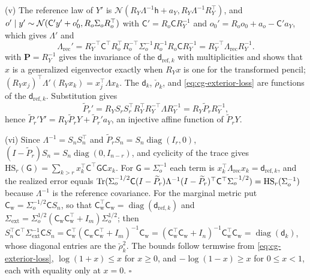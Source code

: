 (v) The reference law of \(Y'\) is
\(\mathcal N(R_Y\Lambda^{-1}\mathsf h+a_Y,R_Y\Lambda^{-1}R_Y^\top)\), and
\(o'\mid y'\sim\mathcal N(\mathsf C'y'+o_0',R_o\Sigma_oR_o^\top)\) with
\(\mathsf C'=R_o\mathsf CR_Y^{-1}\) and \(o_0'=R_oo_0+a_o-\mathsf C'a_Y\), which gives
\(\Lambda'\) and
\begin{equation*}
\Lambda_{\mathrm{rec}}'=R_Y^{-\top}\mathsf C^\top R_o^\top R_o^{-\top}\Sigma_o^{-1}R_o^{-1}R_o\mathsf CR_Y^{-1}=R_Y^{-\top}\Lambda_{\mathrm{rec}}R_Y^{-1}.
\end{equation*}
 with \(\mathbf P=R_Y^{-1}\) gives the invariance of
the \(\mathsf d_{\mathrm{ref},k}\) with multiplicities and shows that \(x\) is a
generalized eigenvector exactly when \(R_Yx\) is one for the transformed pencil;
\((R_Yx_j)^\top\Lambda'(R_Yx_k)=x_j^\top\Lambda x_k\). The \(\mathsf d_k\),
\(\check\rho_k\), and \eqref{eq:cg-exterior-loss} are functions of the
\(\mathsf d_{\mathrm{ref},k}\). Substitution gives
\begin{equation*}
\widetilde P_r'=R_YS_rS_r^\top R_Y^\top R_Y^{-\top}\Lambda R_Y^{-1}=R_Y\widetilde P_rR_Y^{-1},
\end{equation*}
hence \(\widetilde P_r'Y'=R_Y\widetilde P_rY+\widetilde P_r'a_Y\), an injective affine
function of \(\widetilde P_rY\).

(vi) Since \(\Lambda^{-1}=S_nS_n^\top\) and \(\widetilde P_rS_n=S_n\operatorname{diag}(I_r,0)\),
\((I-\widetilde P_r)S_n=S_n\operatorname{diag}(0,I_{n-r})\), and cyclicity of the trace
gives \(\mathrm{HS}_r(\mathsf G)=\sum_{k>r}x_k^\top\mathsf C^\top\mathsf G\mathsf Cx_k\).
For \(\mathsf G=\Sigma_o^{-1}\) each term is \(x_k^\top\Lambda_{\mathrm{rec}}x_k=\mathsf d_{\mathrm{ref},k}\),
and the realized error equals
\(\operatorname{Tr}(\Sigma_o^{-1/2}\mathsf C(I-\widetilde P_r)\Lambda^{-1}(I-\widetilde P_r)^\top\mathsf C^\top\Sigma_o^{-1/2})=\mathrm{HS}_r(\Sigma_o^{-1})\)
because \(\Lambda^{-1}\) is the reference covariance. For the marginal metric put
\(\mathsf C_{\mathrm w}=\Sigma_o^{-1/2}\mathsf CS_n\), so that
\(\mathsf C_{\mathrm w}^\top\mathsf C_{\mathrm w}=\operatorname{diag}(\mathsf d_{\mathrm{ref},k})\)
and
\(\Sigma_{\mathrm{ext}}=\Sigma_o^{1/2}(\mathsf C_{\mathrm w}\mathsf C_{\mathrm w}^\top+I_m)\Sigma_o^{1/2}\);
then
\(S_n^\top\mathsf C^\top\Sigma_{\mathrm{ext}}^{-1}\mathsf CS_n
=\mathsf C_{\mathrm w}^\top(\mathsf C_{\mathrm w}\mathsf C_{\mathrm w}^\top+I_m)^{-1}\mathsf C_{\mathrm w}
=(\mathsf C_{\mathrm w}^\top\mathsf C_{\mathrm w}+I_n)^{-1}\mathsf C_{\mathrm w}^\top\mathsf C_{\mathrm w}
=\operatorname{diag}(\mathsf d_k)\), whose diagonal entries are the
\(\check\rho_k^2\). The bounds follow termwise from \eqref{eq:cg-exterior-loss},
\(\log(1+x)\leq x\) for \(x\geq0\), and \(-\log(1-x)\geq x\) for \(0\leq x<1\),
each with equality only at \(x=0\). \(\square\)

